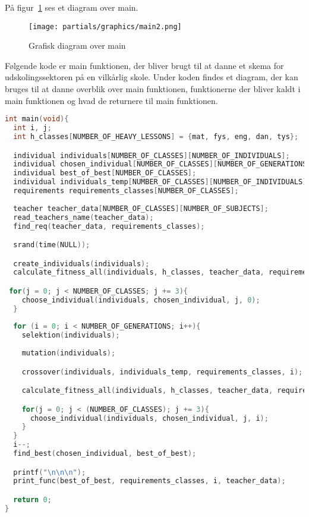 På figur~\ref{fig:diagrammain} ses et diagram over main.
\begin{figure}[!h]
\texttt{[image: partials/graphics/main2.png]}
\caption{Grafisk diagram over main}
\label{fig:diagrammain}
\end{figure}

Følgende kode er main funktionen, der bliver brugt til at danne et skema for udskolingssektoren på en vilkårlig skole. Under koden findes et diagram, der kan bruges til at danne overblik over main funktionen, funktionerne der bliver kaldt i main funktionen og hvad de returnere til main funktionen. 
\begin{lstlisting}[showstringspaces=false,language = c]
int main(void){
  int i, j;
  int h_classes[NUMBER_OF_HEAVY_LESSONS] = {mat, fys, eng, dan, tys};

  individual individuals[NUMBER_OF_CLASSES][NUMBER_OF_INDIVIDUALS];
  individual chosen_individual[NUMBER_OF_CLASSES][NUMBER_OF_GENERATIONS];
  individual best_of_best[NUMBER_OF_CLASSES];
  individual individuals_temp[NUMBER_OF_CLASSES][NUMBER_OF_INDIVIDUALS];
  requirements requirements_classes[NUMBER_OF_CLASSES];
  
  teacher teacher_data[NUMBER_OF_CLASSES][NUMBER_OF_SUBJECTS];
  read_teachers_name(teacher_data);
  find_req(teacher_data, requirements_classes);

  srand(time(NULL));

  create_individuals(individuals);
  calculate_fitness_all(individuals, h_classes, teacher_data, requirements_classes);

 for(j = 0; j < NUMBER_OF_CLASSES; j += 3){
    choose_individual(individuals, chosen_individual, j, 0);
  }
 
  for (i = 0; i < NUMBER_OF_GENERATIONS; i++){
    selektion(individuals);
    
    mutation(individuals);

    crossover(individuals, individuals_temp, requirements_classes, i);

    calculate_fitness_all(individuals, h_classes, teacher_data, requirements_classes);

    for(j = 0; j < (NUMBER_OF_CLASSES); j += 3){
      choose_individual(individuals, chosen_individual, j, i);  
    }
  }
  i--;
  find_best(chosen_individual, best_of_best);

  printf("\n\n\n");
  print_func(best_of_best, requirements_classes, i, teacher_data);

  return 0;
}
\end{lstlisting}

